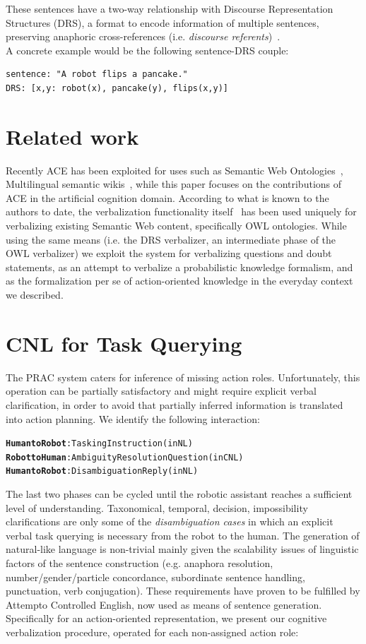 \documentclass[oribibl]{llncs}
\begin{document}
These sentences have a two-way relationship with Discourse Representation Structures (DRS), a format to encode information of multiple sentences, preserving anaphoric cross-references (i.e. \textit{discourse referents})~\cite{kamp1993discourse}.\\
A concrete example would be the following sentence-DRS couple: 
\begin{verbatim}
sentence: "A robot flips a pancake."
DRS: [x,y: robot(x), pancake(y), flips(x,y)]
\end{verbatim}

\section{Related work} Recently ACE has been exploited for uses such 
as Semantic Web Ontologies~\cite{decoi2009rewerse}, Multilingual 
semantic wikis~\cite{kuhnkaljurandsemantic}, while this paper 
focuses on the contributions of ACE in the artificial cognition 
domain. According to what is known to the authors to date, the 
verbalization functionality itself~\cite{kaljurand:phd} has been 
used uniquely for verbalizing existing Semantic Web content, 
specifically OWL ontologies. While using the same means (i.e. the 
DRS verbalizer, an intermediate phase of the OWL verbalizer) we 
exploit the system for verbalizing questions and doubt statements, 
as an attempt to verbalize a probabilistic knowledge formalism, and 
as the formalization per se of action-oriented knowledge in the 
everyday context we described.

\section{CNL for Task Querying}
The PRAC system caters for inference of missing action roles. Unfortunately, this operation can be partially satisfactory and might require explicit verbal clarification, in order to avoid that partially inferred information is translated into action planning.
We identify the following interaction:
{\small
\begin{alltt}
\textbf{\color{Red}Human to Robot} : Tasking Instruction            (in NL)
\textbf{\color{Blue}Robot to Human} : Ambiguity Resolution Question (in CNL)
\textbf{\color{Red}Human to Robot} : Disambiguation Reply           (in NL)
\end{alltt}
}
The last two phases can be cycled until the robotic assistant reaches a sufficient level of understanding. 
Taxonomical, temporal, decision, impossibility clarifications are only some of the \textit{disambiguation cases} in which an explicit verbal task querying is necessary from the robot to the human. 
The generation of natural-like language is non-trivial mainly given the scalability issues of linguistic factors of the sentence construction (e.g. anaphora resolution, number/gender/particle concordance, subordinate sentence handling, punctuation, verb conjugation). These requirements have proven to be fulfilled by Attempto Controlled English, now used as means of sentence generation.\\
Specifically for an action-oriented representation, we present our cognitive verbalization procedure, operated for each non-assigned action role:
\end{document}
